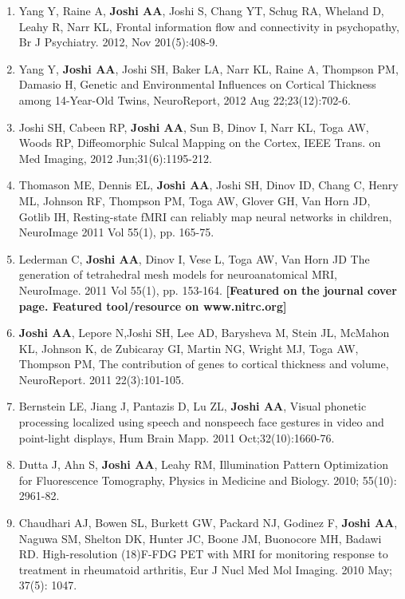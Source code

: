 \documentclass[overlapped,line,letterpaper]{res}
\begin{document}
\begin{resume}
\begin{enumerate}
    \item Yang Y, Raine A, \textbf{Joshi AA}, Joshi S, Chang YT, Schug RA, Wheland D, Leahy R, Narr KL, {Frontal information flow and connectivity in psychopathy}, Br J Psychiatry. 2012, Nov 201(5):408-9.

    \item Yang Y, \textbf{Joshi AA}, Joshi SH, Baker LA, Narr KL, Raine A, Thompson PM, Damasio H, {Genetic and Environmental Influences on Cortical Thickness among 14-Year-Old Twins}, NeuroReport, 2012 Aug 22;23(12):702-6.

    \item Joshi SH, Cabeen RP, \textbf{Joshi AA}, Sun B, Dinov I, Narr KL, Toga AW, Woods RP, {Diffeomorphic Sulcal Mapping on the Cortex}, IEEE Trans. on Med Imaging,  2012 Jun;31(6):1195-212.

    \item Thomason ME, Dennis EL, \textbf{Joshi AA}, Joshi SH, Dinov ID, Chang C, Henry ML, Johnson RF, Thompson PM, Toga AW, Glover GH, Van Horn JD, Gotlib IH, {Resting-state fMRI can reliably map neural networks in children}, NeuroImage 2011 Vol 55(1), pp. 165-75.

    \item Lederman C, \textbf{Joshi AA}, Dinov I, Vese L, Toga AW, Van Horn JD {The generation of tetrahedral mesh models for neuroanatomical MRI}, NeuroImage. 2011 Vol 55(1), pp. 153-164.  \textbf{[Featured on the journal cover page. Featured tool/resource on www.nitrc.org]}

    \item \textbf{Joshi AA}, Lepore N,Joshi SH, Lee AD, Barysheva M, Stein JL, McMahon KL, Johnson K, de Zubicaray GI, Martin NG, Wright MJ, Toga AW, Thompson PM, {The contribution of genes to cortical thickness and volume}, NeuroReport. 2011  22(3):101-105.

    \item Bernstein LE, Jiang J, Pantazis D, Lu ZL, \textbf{Joshi AA}, {Visual phonetic processing localized using speech and nonspeech face gestures in video and point-light displays}, Hum Brain Mapp. 2011 Oct;32(10):1660-76.

    \item Dutta J, Ahn S, \textbf{Joshi AA}, Leahy RM, {Illumination Pattern Optimization for Fluorescence Tomography}, Physics in Medicine and Biology. 2010; 55(10): 2961-82.

    \item Chaudhari AJ, Bowen SL, Burkett GW, Packard NJ, Godinez F, \textbf{Joshi AA}, Naguwa SM, Shelton DK, Hunter JC, Boone JM, Buonocore MH, Badawi RD. {High-resolution (18)F-FDG PET with MRI for monitoring response to treatment in rheumatoid arthritis}, Eur J Nucl Med Mol Imaging. 2010 May; 37(5): 1047.


\end{enumerate}
\end{resume}
\end{document}
